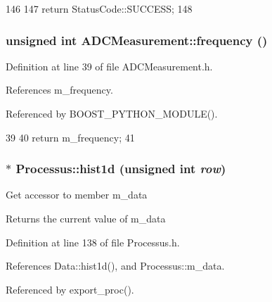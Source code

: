 \begin{DoxyCode}
146                                       {
147   return StatusCode::SUCCESS;
148 }
\end{DoxyCode}
\hypertarget{classADCMeasurement_ad3d523331ad64494f2415319a03c638e}{
\subsubsection[{frequency}]{\setlength{\rightskip}{0pt plus 5cm}unsigned int ADCMeasurement::frequency ()}}
\label{classADCMeasurement_ad3d523331ad64494f2415319a03c638e}


Definition at line 39 of file ADCMeasurement.h.

References m\_\-frequency.

Referenced by BOOST\_\-PYTHON\_\-MODULE().


\begin{DoxyCode}
39                           {
40     return m_frequency;
41   }
\end{DoxyCode}
\hypertarget{classProcessus_a409227db936baff03c0462c1bcfe8069}{
\subsubsection[{hist1d}]{$\ast$ Processus::hist1d (unsigned int {\em row})}}
\label{classProcessus_a409227db936baff03c0462c1bcfe8069}
Get accessor to member m\_\-data \begin{DoxyReturn}{Returns}
the current value of m\_\-data 
\end{DoxyReturn}


Definition at line 138 of file Processus.h.

References Data::hist1d(), and Processus::m\_\-data.

Referenced by export\_\-proc().


